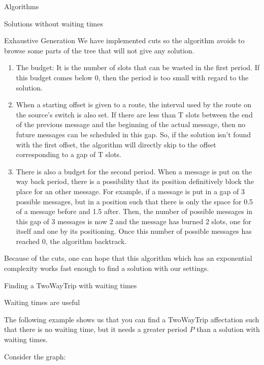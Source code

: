 \documentclass[a4paper,10pt]{report}
\begin{document}
\begin{chapter}{Algorithms}
\begin{section}{Solutions without waiting times}
\begin{subsection}{Exhaustive Generation}
We have implemented cuts so the algorithm avoids to browse some parts of the tree that will not give any solution.
\begin{enumerate}
 \item The budget: It is the number of slots that can be wasted in the first period. If this budget comes below 0, then the period is too small with regard to
 the solution.
 \item When a starting offset is given to a route, the interval used by the route on the source's switch is also set. If there are less than T slots
 between the end of the previous message and the beginning of the actual message, then no future messages can be scheduled in this gap.
 So, if the solution isn't found with the first offset, the algorithm will directly skip to the offset corresponding to a gap of T slots.
 \item There is also a budget for the second period. When a message is put on the way back period, there is a possibility that its position definitively block the place for an other message. For example, if a message is put in a gap of 3 possible messages, but in a position such that there is only the space for 0.5 of a message before and 1.5 after. Then, the number of possible messages in this gap of 3 messages is now 2 and the message has burned 2 slots, one for itself and one by its positioning.
 Once this number of possible messages has reached 0, the algorithm backtrack.
\end{enumerate}

Because of the cuts, one can hope that this algorithm which has an exponential complexity works fast enough to find a solution with our settings.

\end{subsection}

 \end{section}

\begin{section}{Finding a TwoWayTrip with waiting times}
\begin{subsection}{Waiting times are useful}
 
The following example shows us that you can find a TwoWayTrip affectation such that there is no waiting time, but it needs a greater period $P$ than a
solution with waiting times.

Consider the graph: 
\begin{center}
 
\end{center}
\end{subsection}
\end{section}
\end{chapter}
\end{document}
